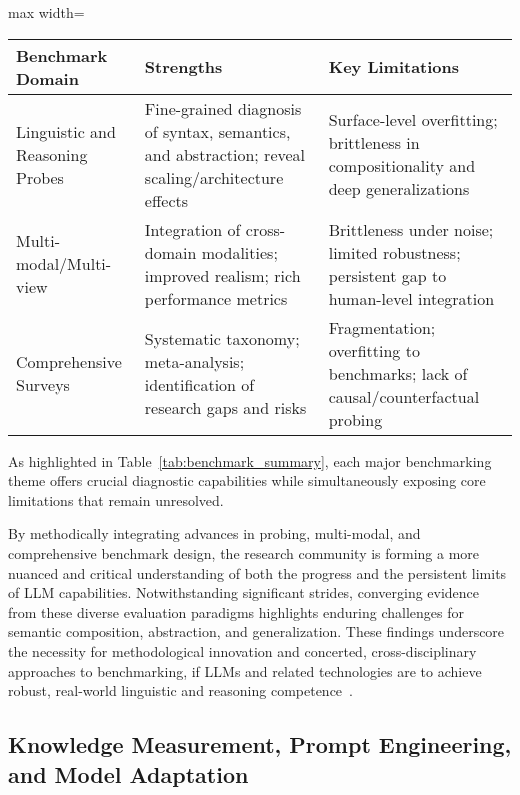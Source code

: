 \documentclass[sigconf]{acmart}
\begin{document}
\begin{table*}[htbp]
  \centering
  \caption{Comparison of Major Benchmark Themes and Identified Limitations}
  \label{tab:benchmark_summary}
  \begin{adjustbox}{max width=\textwidth}
  \begin{tabular}{lll}
    \toprule
    \textbf{Benchmark Domain} & \textbf{Strengths} & \textbf{Key Limitations} \\
    \midrule
    Linguistic and Reasoning Probes & Fine-grained diagnosis of syntax, semantics, and abstraction; reveal scaling/architecture effects & Surface-level overfitting; brittleness in compositionality and deep generalizations \\
    Multi-modal/Multi-view & Integration of cross-domain modalities; improved realism; rich performance metrics & Brittleness under noise; limited robustness; persistent gap to human-level integration \\
    Comprehensive Surveys & Systematic taxonomy; meta-analysis; identification of research gaps and risks & Fragmentation; overfitting to benchmarks; lack of causal/counterfactual probing \\
    \bottomrule
  \end{tabular}
  \end{adjustbox}
\end{table*}

As highlighted in Table~\ref{tab:benchmark_summary}, each major benchmarking theme offers crucial diagnostic capabilities while simultaneously exposing core limitations that remain unresolved.

By methodically integrating advances in probing, multi-modal, and comprehensive benchmark design, the research community is forming a more nuanced and critical understanding of both the progress and the persistent limits of LLM capabilities. Notwithstanding significant strides, converging evidence from these diverse evaluation paradigms highlights enduring challenges for semantic composition, abstraction, and generalization. These findings underscore the necessity for methodological innovation and concerted, cross-disciplinary approaches to benchmarking, if LLMs and related technologies are to achieve robust, real-world linguistic and reasoning competence~\cite{ref92, ref94, ref96, ref97, ref98, ref99}.

\subsection{Knowledge Measurement, Prompt Engineering, and Model Adaptation}
\end{document}
